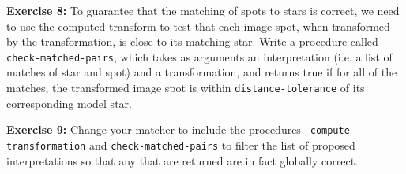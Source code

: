 {\bf Exercise 8:} To guarantee that the matching of spots to stars is correct,
we need to use the computed transform to test that each image spot, when
transformed by the transformation, is close to its matching star.  Write
a procedure called {\tt check-matched-pairs}, which takes as arguments an
interpretation (i.e. a list of matches of star and spot) and a transformation,
and returns true if for all of the matches, the transformed image spot is
within {\tt distance-tolerance} of its corresponding model star.

\null

{\bf Exercise 9:} Change your matcher to include the procedures {\tt
compute-transformation} and {\tt check-matched-pairs} to filter
the list of proposed interpretations so that any that are returned are
in fact globally correct.



